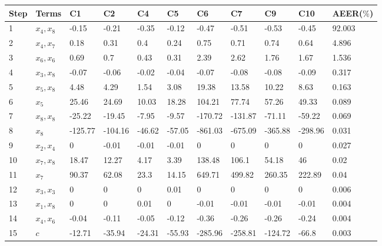 \begin{tabular}{lllllllllll}
Step & Terms & C1 & C2 & C4 & C5 & C6 & C7 & C9 & C10 & AEER($\%$) \\ 
\hline 
1 & $x_4,x_8$ & -0.15 & -0.21 & -0.35 & -0.12 & -0.47 & -0.51 & -0.53 & -0.45 & 92.003 \\ 
2 & $x_4,x_7$ & 0.18 & 0.31 & 0.4 & 0.24 & 0.75 & 0.71 & 0.74 & 0.64 & 4.896 \\ 
3 & $x_6,x_6$ & 0.69 & 0.7 & 0.43 & 0.31 & 2.39 & 2.62 & 1.76 & 1.67 & 1.536 \\ 
4 & $x_3,x_8$ & -0.07 & -0.06 & -0.02 & -0.04 & -0.07 & -0.08 & -0.08 & -0.09 & 0.317 \\ 
5 & $x_5,x_8$ & 4.48 & 4.29 & 1.54 & 3.08 & 19.38 & 13.58 & 10.22 & 8.63 & 0.163 \\ 
6 & $x_5$ & 25.46 & 24.69 & 10.03 & 18.28 & 104.21 & 77.74 & 57.26 & 49.33 & 0.089 \\ 
7 & $x_8,x_8$ & -25.22 & -19.45 & -7.95 & -9.57 & -170.72 & -131.87 & -71.11 & -59.22 & 0.069 \\ 
8 & $x_8$ & -125.77 & -104.16 & -46.62 & -57.05 & -861.03 & -675.09 & -365.88 & -298.96 & 0.031 \\ 
9 & $x_2,x_4$ & 0 & -0.01 & -0.01 & -0.01 & 0 & 0 & 0 & 0 & 0.027 \\ 
10 & $x_7,x_8$ & 18.47 & 12.27 & 4.17 & 3.39 & 138.48 & 106.1 & 54.18 & 46 & 0.02 \\ 
11 & $x_7$ & 90.37 & 62.08 & 23.3 & 14.15 & 649.71 & 499.82 & 260.35 & 222.89 & 0.04 \\ 
12 & $x_3,x_3$ & 0 & 0 & 0 & 0.01 & 0 & 0 & 0 & 0 & 0.006 \\ 
13 & $x_1,x_8$ & 0 & 0 & 0.01 & 0 & -0.01 & -0.01 & -0.01 & -0.01 & 0.004 \\ 
14 & $x_4,x_6$ & -0.04 & -0.11 & -0.05 & -0.12 & -0.36 & -0.26 & -0.26 & -0.24 & 0.004 \\ 
15 & $c$ & -12.71 & -35.94 & -24.31 & -55.93 & -285.96 & -258.81 & -124.72 & -66.8 & 0.003 \\ 
\hline 
\end{tabular}